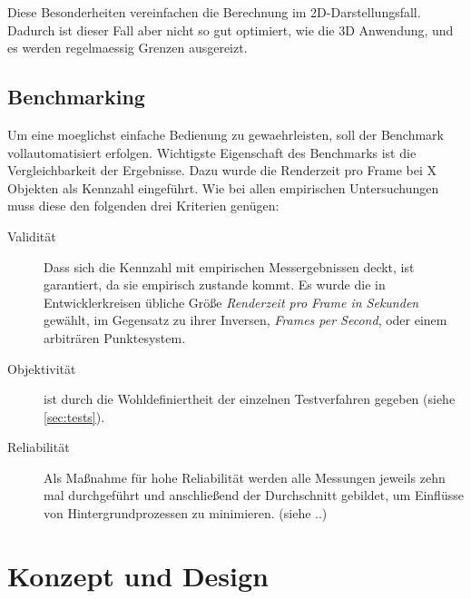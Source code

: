 Diese Besonderheiten vereinfachen die Berechnung im 2D-Darstellungsfall. Dadurch ist dieser Fall aber nicht so gut optimiert, wie die 3D Anwendung, und es werden regelmaessig Grenzen ausgereizt.

\section{Benchmarking}
Um eine moeglichst einfache Bedienung zu gewaehrleisten, soll der Benchmark vollautomatisiert erfolgen. Wichtigste Eigenschaft des Benchmarks ist die Vergleichbarkeit der Ergebnisse. Dazu wurde die Renderzeit pro Frame bei X Objekten als Kennzahl eingeführt. Wie bei allen empirischen Untersuchungen muss diese den folgenden drei Kriterien genügen:\\
\begin{description}
\item[Validität] Dass sich die Kennzahl mit empirischen Messergebnissen deckt, ist garantiert, da sie empirisch zustande kommt. Es wurde die in Entwicklerkreisen übliche Größe {\em Renderzeit pro Frame in Sekunden} gewählt, im Gegensatz zu ihrer Inversen, {\em Frames per Second}, oder einem arbiträren Punktesystem.\\
\item[Objektivität] ist durch die Wohldefiniertheit der einzelnen Testverfahren gegeben (siehe \ref{sec:tests}).\\
\item[Reliabilität] Als Maßnahme für hohe Reliabilität werden alle Messungen jeweils zehn mal durchgeführt und anschließend der Durchschnitt gebildet, um Einflüsse von Hintergrundprozessen zu minimieren. (siehe ..) \\
\end{description}

\chapter{Konzept und Design}

